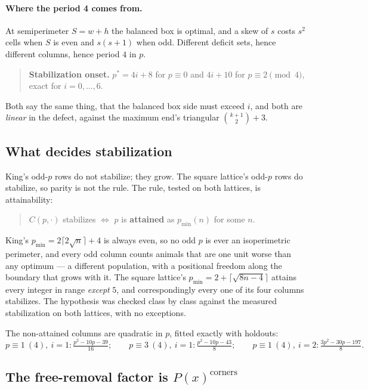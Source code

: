 \documentclass[11pt]{article}
\newcommand{\pminn}{p_{\min}}
\begin{document}
\paragraph{Where the period 4 comes from.} At semiperimeter $S = w + h$ the
balanced box is optimal, and a skew of $s$ costs $s^2$ cells when $S$ is even and
$s(s+1)$ when odd. Different deficit sets, hence different columns, hence period
$4$ in $p$.

\begin{quote}
\textbf{Stabilization onset.} $p^\ast = 4i + 8$ for $p \equiv 0$ and $4i + 10$
for $p \equiv 2 \pmod 4$, exact for $i = 0,\dots,6$.
\end{quote}

Both say the same thing, that the balanced box side must exceed $i$, and both
are \emph{linear} in the defect, against the maximum end's triangular
$\binom{k+1}{2}+3$.

\subsection{What decides stabilization}

King's odd-$p$ rows do not stabilize; they grow. The square lattice's odd-$p$
rows do stabilize, so parity is not the rule. The rule, tested on both lattices,
is attainability:

\begin{quote}
$C(p,\cdot)$ stabilizes $\iff$ $p$ is \textbf{attained} as $\pminn(n)$ for some
$n$.
\end{quote}

King's $\pminn = 2\lceil2\sqrt n\rceil + 4$ is always even, so no odd $p$ is ever
an isoperimetric perimeter, and every odd column counts animals that are one unit
worse than any optimum --- a different population, with a positional freedom
along the boundary that grows with it. The square lattice's
$\pminn = 2 + \lceil\sqrt{8n-4}\rceil$ attains every integer in range
\emph{except} $5$, and correspondingly every one of its four columns stabilizes.
The hypothesis was checked class by class against the measured stabilization on
both lattices, with no exceptions.

The non-attained columns are quadratic in $p$, fitted exactly with holdouts:
\[
  p \equiv 1\ (4),\ i{=}1: \tfrac{p^2-10p-39}{16};\qquad
  p \equiv 3\ (4),\ i{=}1: \tfrac{p^2-10p-43}{8};\qquad
  p \equiv 1\ (4),\ i{=}2: \tfrac{3p^2-30p-197}{8}.
\]

\subsection{The free-removal factor is \texorpdfstring{$P(x)^{\text{corners}}$}{P(x)\^{}corners}}
\label{sec:tips}
\end{document}

